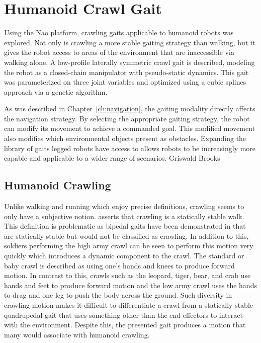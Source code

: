 
\chapter{Humanoid Crawl Gait} \label{ch:crawl_gait}

Using the Nao platform, crawling gaits applicable to humanoid robots was explored. 
Not only is crawling a more stable gaiting strategy than walking, but it gives the robot access to areas
of the environment that are inaccessible via walking alone. A low-profile laterally symmetric crawl gait is described, 
modeling the robot as a closed-chain manipulator with pseudo-static dynamics. This gait was parameterized on 
three joint variables and optimized using a cubic splines approach via a genetic algorithm.

As was described in Chapter~\ref{ch:navigation}, the gaiting modality directly affects the navigation strategy.
By selecting the appropriate gaiting strategy, the robot can modify its movement to achieve a commanded goal.
This modified movement also modifies which environmental objects present as obstacles.
Expanding the library of gaits legged robots have access to allows robots to be increasingly more capable
and applicable to a wider range of scenarios.
Griswald Brooks
\section{Humanoid Crawling}

Unlike walking and running which enjoy precise definitions, crawling seems to only have a subjective notion.
\cite{Dudek2000} asserts that crawling is a statically stable walk. This definition is problematic
as bipedal gaits have been demonstrated in \cite{figureoutacitation} that are statically stable but would not
be classified as crawling. In addition to this, soldiers performing the high army crawl \cite{armyfieldmanual2008} can be seen to
perform this motion very quickly which introduces a dynamic component to the crawl.
The standard or baby crawl is described as using one's hands and knees to produce forward motion.
In contrast to this, crawls such as the leopard, tiger, bear, and crab use hands and feet to produce
forward motion and the low army crawl uses the hands to drag and one leg to push the body across the ground.
Such diversity in crawling motion makes it difficult to differentiate a crawl from a statically stable
quadrupedal gait that uses something other than the end effectors to interact with the environment.
Despite this, the presented gait produces a motion that many would associate with humanoid crawling.

